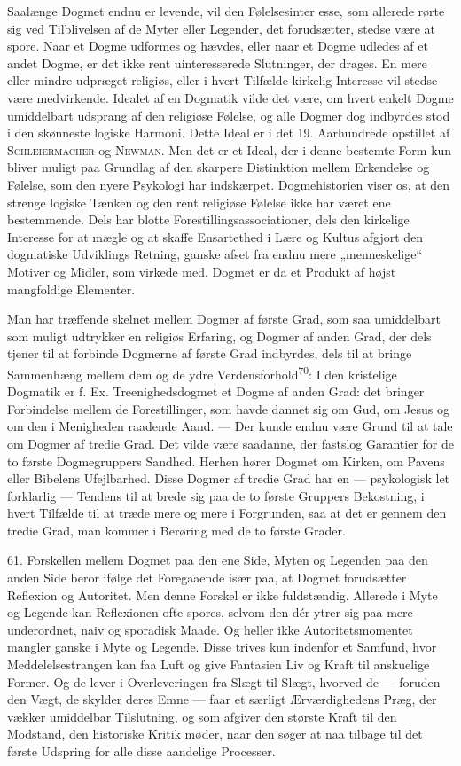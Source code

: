 \documentclass[12pt,a4paper,openany]{book}
\newcommand{\opage}[1]{\marginnote{\footnotesize\textit{[#1]}}}
\begin{document}
Saalænge Dogmet endnu er levende, vil den Følelsesinter%
\opage{136}esse, som allerede rørte sig ved Tilblivelsen af de Myter
eller Legender, det forudsætter, stedse være at spore. Naar et Dogme
udformes og hævdes, eller naar et Dogme udledes af et andet Dogme, er
det ikke rent uinteresserede Slutninger, der drages. En mere eller
mindre udpræget religiøs, eller i hvert Tilfælde kirkelig Interesse vil
stedse være medvirkende. Idealet af en Dogmatik vilde det være, om hvert
enkelt Dogme umiddelbart udsprang af den religiøse Følelse, og alle
Dogmer dog indbyrdes stod i den skønneste logiske Harmoni. Dette Ideal
er i det 19. Aarhundrede opstillet af \textsc{Schleiermacher} og
\textsc{Newman}. Men det er et Ideal, der i denne bestemte Form kun
bliver muligt paa Grundlag af den skarpere Distinktion mellem Erkendelse
og Følelse, som den nyere Psykologi har indskærpet. Dogmehistorien viser
os, at den strenge logiske Tænken og den rent religiøse Følelse ikke har
været ene bestemmende. Dels har blotte Forestillingsassociationer, dels
den kirkelige Interesse for at mægle og at skaffe Ensartethed i Lære og
Kultus afgjort den dogmatiske Udviklings Retning, ganske afset fra endnu
mere „menneskelige“ Motiver og Midler, som virkede med. Dogmet er da et
Produkt af højst mangfoldige Elementer.

Man har træffende skelnet mellem Dogmer af første Grad, som saa
umiddelbart som muligt udtrykker en religiøs Erfaring, og Dogmer af
anden Grad, der dels tjener til at forbinde Dogmerne af første Grad
indbyrdes, dels til at bringe Sammenhæng mellem dem og de ydre
Verdensforhold\textsuperscript{70}: I den kristelige Dogmatik er f. Ex.
Treenighedsdogmet et Dogme af anden Grad: det bringer Forbindelse mellem
de Forestillinger, som havde dannet sig om Gud, om Jesus og om den i
Menigheden raadende Aand. --- Der kunde endnu være Grund til at tale om
Dogmer af tredie Grad. Det vilde være saadanne, der fastslog Garantier
for de to første Dogmegruppers Sandhed. Herhen hører Dogmet om Kirken,
om Pavens eller Bibelens Ufejlbarhed. Disse Dogmer af tredie Grad har en
--- psykologisk let forklarlig --- Tendens til at brede sig paa de to
første Gruppers Bekostning, i hvert Tilfælde til at træde mere og mere i
Forgrunden, saa at det er gennem den tredie Grad, man kommer i Berøring
med de to første Grader.

61. Forskellen mellem Dogmet paa den ene Side, Myten og Legenden paa den
anden Side beror ifølge det Foregaaende især paa, at Dogmet forudsætter
Reflexion og Autoritet. Men denne Forskel er ikke fuldstændig. Allerede
i Myte og Legende kan Reflexionen ofte spores, selvom den dér ytrer sig
paa mere
\opage{137}underordnet, naiv og sporadisk Maade. Og heller ikke
Autoritetsmomentet mangler ganske i Myte og Legende. Disse trives kun
indenfor et Samfund, hvor Meddelelsestrangen kan faa Luft og give
Fantasien Liv og Kraft til anskuelige Former. Og de lever i
Overleveringen fra Slægt til Slægt, hvorved de --- foruden den Vægt, de
skylder deres Emne --- faar et særligt Ærværdighedens Præg, der vækker
umiddelbar Tilslutning, og som afgiver den største Kraft til den
Modstand, den historiske Kritik møder, naar den søger at naa tilbage til
det første Udspring for alle disse aandelige Processer.
\end{document}
